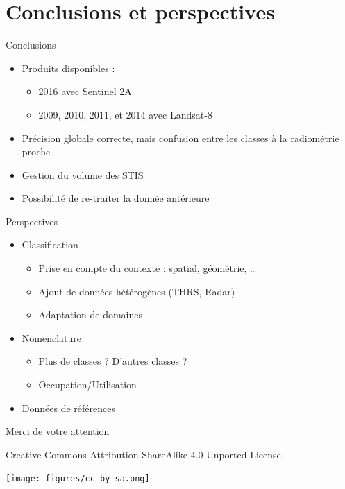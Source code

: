 \documentclass[pressentation,10pt,aspectratio=1610, xcolor=table]{beamer}
\begin{document}
\section{Conclusions et perspectives}
\label{sec:org4a2b6c7}
\begin{frame}[label={sec:org7c7e9ef}]{Conclusions}
\begin{itemize}
\item Produits disponibles : 
\begin{itemize}
\item 2016 avec Sentinel 2A
\item 2009, 2010, 2011, et 2014 avec Landsat-8
\end{itemize}
\item Précision globale correcte, mais confusion entre les classes à la radiométrie proche
\item Gestion du volume des STIS
\item Possibilité de re-traiter la donnée antérieure
\end{itemize}
\end{frame}
\begin{frame}[label={sec:orgb60cdf9}]{Perspectives}
\begin{itemize}
\item Classification
\begin{itemize}
\item Prise en compte du contexte : spatial, géométrie, \ldots{}
\item Ajout de données hétérogènes (THRS, Radar)
\item Adaptation de domaines
\end{itemize}
\item Nomenclature
\begin{itemize}
\item Plus de classes ? D'autres classes ?
\item Occupation/Utilisation
\end{itemize}
\item Données de références
\end{itemize}
\end{frame}
\begin{frame}[label=conclusion,standout]{}
\begin{center}
Merci de votre attention
\end{center}
\end{frame}
\begin{frame}[label={sec:org30597b6}]{}
\begin{center}
\tiny Creative Commons Attribution-ShareAlike 4.0 Unported License
\normalsize

\begin{center}
\texttt{[image: figures/cc-by-sa.png]}
\end{center}
\end{center}
\end{frame}
\end{document}

